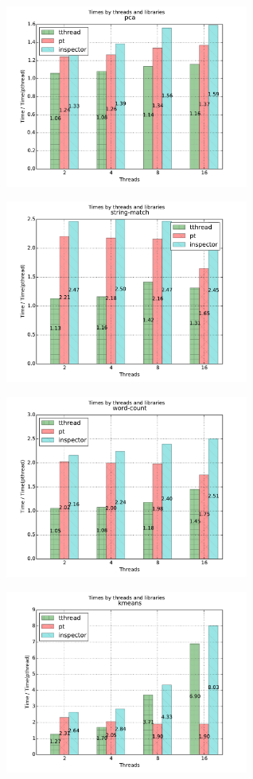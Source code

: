 \begin{figure}[h]
\includegraphics[width=8cm]{figure/pca.pdf}
\end{figure}

\begin{figure}[h]
\includegraphics[width=8cm]{figure/string-match.pdf}
\end{figure}

\begin{figure}[h]
\includegraphics[width=8cm]{figure/word-count.pdf}
\end{figure}

\begin{figure}[h]
\includegraphics[width=8cm]{figure/kmeans.pdf}
\end{figure}

